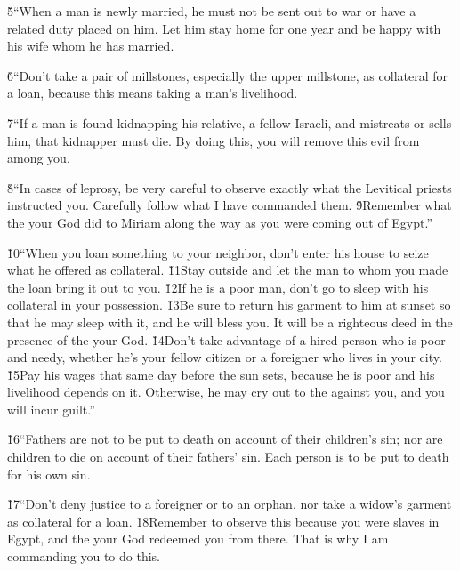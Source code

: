 \v{5}``When a man is newly married, he must not be sent out to war or have a related duty placed on him. Let him stay home for one year and be happy with his wife whom he has married.

\v{6}``Don't take a pair of millstones, especially the upper millstone, as collateral for a loan, because this means taking a man's livelihood.

\v{7}``If a man is found kidnapping his relative, a fellow Israeli, and mistreats or sells him, that kidnapper must die. By doing this, you will remove this evil from among you.

\v{8}``In cases of leprosy, be very careful to observe exactly what the Levitical priests instructed you. Carefully follow what I have commanded them. \v{9}Remember what the  your God did to Miriam along the way as you were coming out of Egypt.''

\v{10}``When you loan something to your neighbor, don't enter his house to seize what he offered as collateral. \v{11}Stay outside and let the man to whom you made the loan bring it out to you. \v{12}If he is a poor man, don't go to sleep with his collateral in your possession. \v{13}Be sure to return his garment to him at sunset so that he may sleep with it, and he will bless you. It will be a righteous deed in the presence of the  your God. \v{14}Don't take advantage of a hired person who is poor and needy, whether he's your fellow citizen or a foreigner who lives in your city. \v{15}Pay his wages that same day before the sun sets, because he is poor and his livelihood depends on it. Otherwise, he may cry out to the  against you, and you will incur guilt.''

\v{16}``Fathers are not to be put to death on account of their children's sin; nor are children to die on account of their fathers' sin. Each person is to be put to death for his own sin.

\v{17}``Don't deny justice to a foreigner or to an orphan, nor take a widow's garment as collateral for a loan. \v{18}Remember to observe this because you were slaves in Egypt, and the  your God redeemed you from there. That is why I am commanding you to do this.

